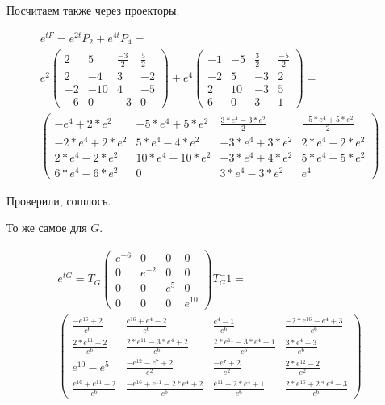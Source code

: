 \documentclass[12pt, a4paper]{article}
\begin{document}
    Посчитаем также через проекторы.

    \begin{multline}
        e^{t F} = e^{2t} P_2 + e^{4t} P_4 = \\
        e^2 \left(\begin{matrix}
            2 & 5 & \frac{-3}{2} & \frac{5}{2} \\
            2 & -4 & 3 & -2 \\
            -2 & -10 & 4 & -5 \\
            -6 & 0 & -3 & 0
        \end{matrix}\right) + e^4 \left(\begin{matrix}
            -1 & -5 & \frac{3}{2} & \frac{-5}{2} \\
            -2 & 5 & -3 & 2 \\
            2 & 10 & -3 & 5 \\
            6 & 0 & 3 & 1
        \end{matrix}\right) = \\
        \left(\begin{matrix}
            -e^4+2*e^2 & -5*e^4+5*e^2 & \frac{3*e^4-3*e^2}{2} & \frac{-5*e^4+5*e^2}{2} \\
            -2*e^4+2*e^2 & 5*e^4-4*e^2 & -3*e^4+3*e^2 & 2*e^4-2*e^2 \\
            2*e^4-2*e^2 & 10*e^4-10*e^2 & -3*e^4+4*e^2 & 5*e^4-5*e^2 \\
            6*e^4-6*e^2 & 0 & 3*e^4-3*e^2 & e^4
        \end{matrix}\right)
    \end{multline}

    Проверили, сошлось.

    То же самое для $G$.

    \begin{multline}
        e^{t G} = T_G \left(\begin{matrix}
            e^{-6} & 0 & 0 & 0 \\
            0 & e^{-2} & 0 & 0 \\
            0 & 0 & e^{5} & 0 \\
            0 & 0 & 0 & e^{10}
        \end{matrix}\right) T_G^-1 = \\ \left(\begin{matrix}
            \frac{-e^{16}+2}{e^6} & \frac{e^{16}+e^4-2}{e^6} & \frac{e^4-1}{e^6} & \frac{-2*e^{16}-e^4+3}{e^6} \\
            \frac{2*e^{11}-2}{e^6} & \frac{2*e^{11}-3*e^4+2}{e^6} & \frac{2*e^{11}-3*e^4+1}{e^6} & \frac{3*e^4-3}{e^6} \\
            e^{10}-e^5 & \frac{-e^{12}-e^7+2}{e^2} & \frac{-e^7+2}{e^2} & \frac{2*e^{12}-2}{e^2} \\
            \frac{e^{16}+e^{11}-2}{e^6} & \frac{-e^{16}+e^{11}-2*e^4+2}{e^6} & \frac{e^{11}-2*e^4+1}{e^6} & \frac{2*e^{16}+2*e^4-3}{e^6}
        \end{matrix}\right)
    \end{multline}
\end{document}
